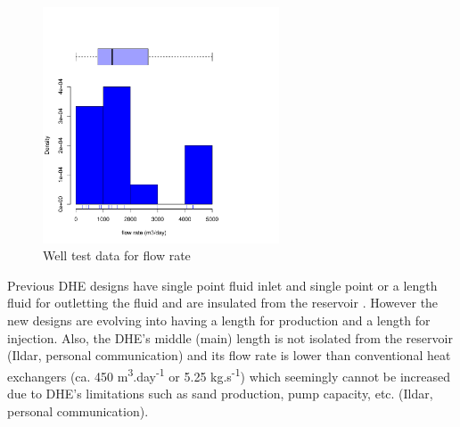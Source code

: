 \documentclass[review,authoryear, 12pt]{elsarticle}\usepackage[]{graphicx}\usepackage[]{color}
\newenvironment{knitrout}{}{} %
\begin{document}
\begin{knitrout}
\color{fgcolor}\begin{figure}[]


{\centering \includegraphics[width=7cm,height=7cm]{figure/flowrate} 

}

\caption[Well test data for flow rate]{Well test data for flow rate\label{Fig:flowrate}}
\end{figure}


\end{knitrout}


Previous DHE designs have single point fluid inlet and single point or a length fluid for outletting the fluid and are insulated from the reservoir \citep{feng2012numerical}. However the new designs are evolving into having a length for production and a length for injection. Also, the DHE's middle (main) length is not isolated from the reservoir (Ildar, personal communication) and its flow rate is lower than conventional heat exchangers (ca. 450 m\textsuperscript{3}.day\textsuperscript{-1} or 5.25 kg.s\textsuperscript{-1}) \citep{feng2012numerical} which seemingly cannot be increased due to DHE's limitations such as sand production, pump capacity, etc. (Ildar, personal communication). 






\end{document}
